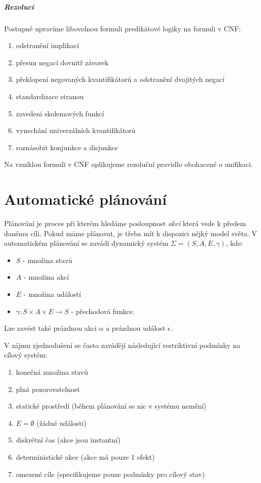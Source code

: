 \documentclass[a4paper]{article}      %
\begin{document}
\subparagraph{Rezolucí}
Postupně upravíme libovolnou formuli predikátové logiky na formuli v CNF:
\begin{enumerate}
\item odstranění implikací
\item přesun negací dovnitř závorek
\item překlopení negovaných kvantifikátorů a odstranění dvojitých negací
\item standardizace stranou
\item zavedení skolemových funkcí
\item vynechání univerzálních kvantifikátorů
\item roznásobit konjunkce a disjunkce
\end{enumerate}

Na vzniklou formuli v CNF aplikujeme rezoluční pravidlo obohacené o unifikaci.

\section{Automatické plánování}
Plánování je proces při kterém hledáme posloupnost \emph{akcí} která vede k předem danému cíli.
Pokud máme plánovat, je třeba mít k dispozici nějký model světa. V automatickém plánování se
zavádí dynamický systém $\Sigma = (S,A,E,\gamma)$, kde:
\begin{itemize}
\item $S$ - množina stavů
\item $A$ - množina akcí
\item $E$ - množina událostí
\item $\gamma: S \times A \times E \rightarrow S$ - přechodová funkce.
\end{itemize}
Lze zavést také prázdnou akci $\alpha$ a prázdnou událost $\epsilon$.

V zájmu zjednodušení se často zavádějí
následující restriktivní podmínky na cílový systém:
\begin{enumerate}
\item konečná množina stavů
\item plná pozorovatelnost
\item statické prostředí (během plánování se nic v systému nemění)
\item $E = \emptyset$ (žádné události)
\item diskrétní čas (akce jsou instantní)
\item deterministické akce (akce má pouze 1 efekt)
\item omezené cíle (specifikujeme pouze podmínky pro cílový stav)
\end{enumerate} 
\end{document}
